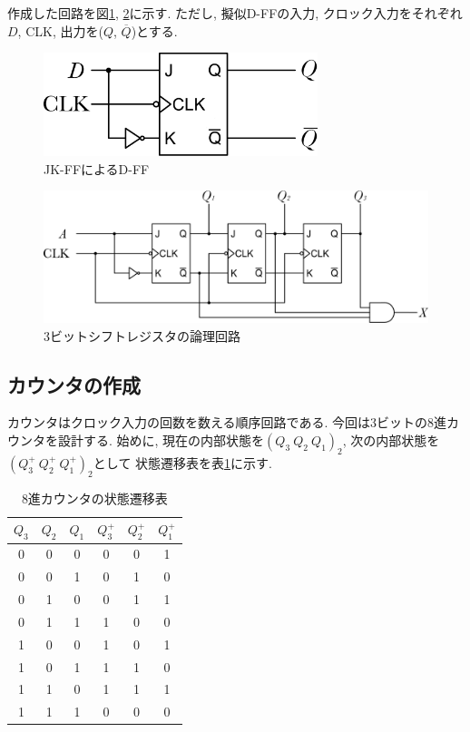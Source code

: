 \documentclass[titlepage]{jsarticle}
\begin{document}
    作成した回路を図\ref{fig:JK-FF_by_D-FF}, \ref{fig:shift_register}に示す.
    ただし, 擬似D-FFの入力, クロック入力をそれぞれ$D$, CLK, 出力を($Q$, $\overline{Q}$)とする.

    \begin{figure}[h]
      \centering
      \includegraphics[width=8cm]{images/d_w_jk.pdf}
      \caption{JK-FFによるD-FF}
      \label{fig:JK-FF_by_D-FF}
    \end{figure}
    \begin{figure}[h]
      \centering
      \includegraphics[width=15cm]{images/shift.pdf}
      \caption{3ビットシフトレジスタの論理回路}
      \label{fig:shift_register}
    \end{figure}
  \subsection{カウンタの作成}
    カウンタはクロック入力の回数を数える順序回路である.
    今回は3ビットの8進カウンタを設計する.
    始めに, 現在の内部状態を$(Q_3 \ Q_2 \ Q_1)_2$, 次の内部状態を$(Q_3^+ \ Q_2^+ \ Q_1^+)_2$として
    状態遷移表を表\ref{tab:counter}に示す.
    \begin{table}[h]
      \caption{8進カウンタの状態遷移表}
      \label{tab:counter}
      \centering
      \begin{tabular}{ccc||ccc}
        \hline
        $Q_3$ & $Q_2$ & $Q_1$ & $Q_3^+$ & $Q_2^+$ & $Q_1^+$ \\ \hline \hline
        0 & 0 & 0 & 0 & 0 & 1 \\
        0 & 0 & 1 & 0 & 1 & 0 \\
        0 & 1 & 0 & 0 & 1 & 1 \\
        0 & 1 & 1 & 1 & 0 & 0 \\
        1 & 0 & 0 & 1 & 0 & 1 \\
        1 & 0 & 1 & 1 & 1 & 0 \\
        1 & 1 & 0 & 1 & 1 & 1 \\
        1 & 1 & 1 & 0 & 0 & 0 \\ \hline
      \end{tabular}
    \end{table}
\end{document}
